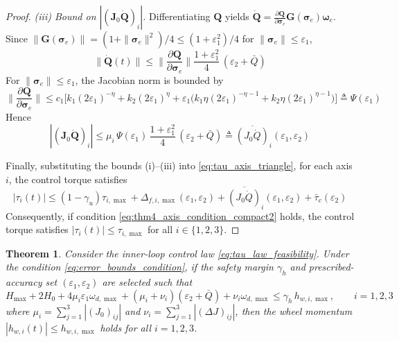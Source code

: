 \documentclass[journal]{new-aiaa}
\newtheorem{theorem}{Theorem}
\begin{document}
\begin{proof}
\emph{(iii) Bound on $|(\boldsymbol{J}_0\dot{\boldsymbol{Q}})_i|$.}
Differentiating $\boldsymbol{Q}$ yields
$\dot{\boldsymbol{Q}} = \frac{\partial\boldsymbol{Q}}{\partial\boldsymbol{\sigma}_e}\boldsymbol{G}(\boldsymbol{\sigma}_e)\boldsymbol{\omega}_e$.
Since $\|\boldsymbol{G}(\boldsymbol{\sigma}_e)\| = (1+\|\boldsymbol{\sigma}_e\|^2)/4 \le (1+\varepsilon_1^2)/4$ for $\|\boldsymbol{\sigma}_e\|\le\varepsilon_1$,
\begin{equation}
\|\dot{\boldsymbol{Q}}(t)\|
\le \Big\|\frac{\partial\boldsymbol{Q}}{\partial\boldsymbol{\sigma}_e}\Big\|
\frac{1+\varepsilon_1^2}{4}\,(\varepsilon_2+\bar Q)
\end{equation}
For $\|\boldsymbol{\sigma}_e\|\le\varepsilon_1$, the Jacobian norm is bounded by
\begin{equation}
\Big\|\frac{\partial\boldsymbol{Q}}{\partial\boldsymbol{\sigma}_e}\Big\|
\le c_1\Big[k_1(2\varepsilon_1)^{-\eta} + k_2(2\varepsilon_1)^{\eta}
+ \varepsilon_1\big(k_1\eta(2\varepsilon_1)^{-\eta-1} + k_2\eta(2\varepsilon_1)^{\eta-1}\big)\Big]
\triangleq \Psi(\varepsilon_1)
\label{eq:Psi_def_thm4}
\end{equation}
Hence
\begin{equation}
|(\boldsymbol{J}_0\dot{\boldsymbol{Q}})_i|
\le \mu_i\,\Psi(\varepsilon_1)\,\frac{1+\varepsilon_1^2}{4}\,(\varepsilon_2+\bar Q)
\triangleq \overline{(J_0\dot Q)}_i(\varepsilon_1,\varepsilon_2)
\label{eq:thm4_JQdot_bar_compact2}
\end{equation}

Finally, substituting the bounds (i)--(iii) into \eqref{eq:tau_axis_triangle}, for each axis $i$, the control torque satisfies
\[
|\tau_i(t)|
\le (1-\gamma_u)\tau_{i,\max}
+\Delta_{f,i,\max}(\varepsilon_1,\varepsilon_2)
+\overline{(J_0\dot Q)}_i(\varepsilon_1,\varepsilon_2)
+\bar\tau_c(\varepsilon_2)
\]
Consequently, if condition \eqref{eq:thm4_axis_condition_compact2} holds, the control torque satisfies $|\tau_i(t)| \le \tau_{i,\max}$ for all $i \in \{1,2,3\}$.
\end{proof}

\begin{theorem}
\label{thm:feasibility_momentum}
Consider the inner-loop control law \eqref{eq:tau_law_feasibility}. Under the condition \eqref{eq:error_bounds_condition}, 
if the safety margin $\gamma_h$ and prescribed-accuracy set $(\varepsilon_1,\varepsilon_2)$ are selected such that
\begin{equation}
H_{\max} + 2H_0 + 4\mu_i\varepsilon_1\omega_{d,\max} + (\mu_i + \nu_i) (\varepsilon_2 + \bar Q) + \nu_i \omega_{d,\max}\le \gamma_h\, h_{w,i,\max},\qquad i=1,2,3
\label{eq:thm5_axis_condition}
\end{equation}
where $\mu_i = \sum_{j=1}^{3}|(J_0)_{ij}|$ and $\nu_i = \sum_{j=1}^{3}|(\Delta J)_{ij}|$,
then the wheel momentum $|h_{w,i}(t)|\le h_{w,i,\max}$ holds for all $i=1,2,3$.
\end{theorem}
\end{document}
